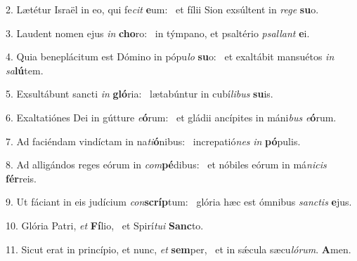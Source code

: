 2. Lætétur Israël in eo, qui fe\textit{cit} \textbf{e}um: \ast\  et fílii Sion exsúltent in \textit{re}\textit{ge} \textbf{su}o.\

3. Laudent nomen ejus \textit{in} \textbf{cho}ro: \ast\  in týmpano, et psaltério \textit{psal}\textit{lant} \textbf{e}i.\

4. Quia beneplácitum est Dómino in pópu\textit{lo} \textbf{su}o: \ast\  et exaltábit mansuétos \textit{in} \textit{sa}\textbf{lú}tem.\

5. Exsultábunt sancti \textit{in} \textbf{gló}ria: \ast\  lætabúntur in cubí\textit{li}\textit{bus} \textbf{su}is.\

6. Exaltatiónes Dei in gútture \textit{e}\textbf{ó}rum: \ast\  et gládii ancípites in máni\textit{bus} \textit{e}\textbf{ó}rum.\

7. Ad faciéndam vindíctam in na\textit{ti}\textbf{ó}nibus: \ast\  increpatió\textit{nes} \textit{in} \textbf{pó}pulis.\

8. Ad alligándos reges eórum in \textit{com}\textbf{pé}dibus: \ast\  et nóbiles eórum in má\textit{ni}\textit{cis} \textbf{fér}reis.\

9. Ut fáciant in eis judícium \textit{con}\textbf{scríp}tum: \ast\  glória hæc est ómnibus \textit{sanc}\textit{tis} \textbf{e}jus.\

10. Glória Patri, \textit{et} \textbf{Fí}lio, \ast\  et Spirí\textit{tu}\textit{i} \textbf{Sanc}to.\

11. Sicut erat in princípio, et nunc, \textit{et} \textbf{sem}per, \ast\  et in sǽcula sæcu\textit{ló}\textit{rum}. \textbf{A}men.\

